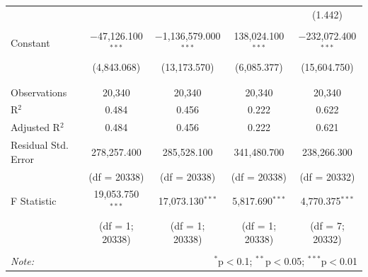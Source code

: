 \documentclass[12pt,a4paper]{article}
\begin{document}
\begin{table}[H]
\begin{adjustbox}{width=1\textwidth}
\begin{tabular}{@{\extracolsep{5pt}}lcccc}
		&  &  &  & (1.442) \\ 
		& & & & \\ 
		Constant & $-$47,126.100$^{***}$ & $-$1,136,579.000$^{***}$ & 138,024.100$^{***}$ & $-$232,072.400$^{***}$ \\ 
		& (4,843.068) & (13,173.570) & (6,085.377) & (15,604.750) \\ 
		& & & & \\ 
		\hline \\[-1.8ex] 
		Observations & 20,340 & 20,340 & 20,340 & 20,340 \\ 
		R$^{2}$ & 0.484 & 0.456 & 0.222 & 0.622 \\ 
		Adjusted R$^{2}$ & 0.484 & 0.456 & 0.222 & 0.621 \\
		Residual Std. Error & 278,257.400 & 285,528.100 & 341,480.700 & 238,266.300 \\ 
		& (df = 20338) & (df = 20338) & (df = 20338) & (df = 20332) \\
		F Statistic & 19,053.750$^{***}$ & 17,073.130$^{***}$ & 5,817.690$^{***}$ & 4,770.375$^{***}$ \\ 
		& (df = 1; 20338) & (df = 1; 20338) & (df = 1; 20338) & (df = 7; 20332) \\
		\hline 
		\hline \\[-1.8ex] 
		\textit{Note:}  & \multicolumn{4}{r}{$^{*}$p$<$0.1; $^{**}$p$<$0.05; $^{***}$p$<$0.01} \\ 
	\end{tabular}
	\end{adjustbox}
\end{table} 
\end{document}
